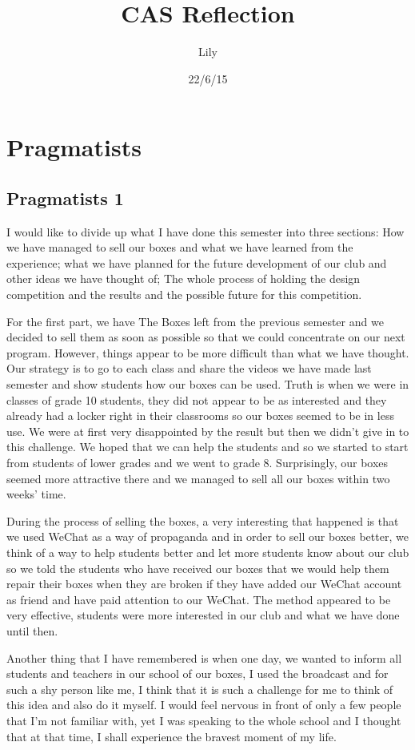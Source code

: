 \documentclass[11pt,a4paper,titlepage]{article}
\author{Lily}
\date{22/6/15}
\title{CAS Reflection}
\begin{document}
\maketitle

\tableofcontents
\clearpage

\section{Pragmatists}
\subsection{Pragmatists 1}
I would like to divide up what I have done this semester into three sections: How we have managed to sell our boxes and what we have learned from the experience; what we have planned for the future development of our club and other ideas we have thought of; The whole process of holding the design competition and the results and the possible future for this competition.

For the first part, we have The Boxes left from the previous semester and we decided to sell them as soon as possible so that we could concentrate on our next program. However, things appear to be more difficult than what we have thought. Our strategy is to go to each class and share the videos we have made last semester and show students how our boxes can be used. Truth is when we were in classes of grade 10 students, they did not appear to be as interested and they already had a locker right in their classrooms so our boxes seemed to be in less use. We were at first very disappointed by the result but then we didn’t give in to this challenge. We hoped that we can help the students and so we started to start from students of lower grades and we went to grade 8. Surprisingly, our boxes seemed more attractive there and we managed to sell all our boxes within two weeks’ time.

During the process of selling the boxes, a very interesting that happened is that we used WeChat as a way of propaganda and in order to sell our boxes better, we think of a way to help students better and let more students know about our club so we told the students who have received our boxes that we would help them repair their boxes when they are broken if they have added our WeChat account as friend and have paid attention to our WeChat. The method appeared to be very effective, students were more interested in our club and what we have done until then.

Another thing that I have remembered is when one day, we wanted to inform all students and teachers in our school of our boxes, I used the broadcast and for such a shy person like me, I think that it is such a challenge for me to think of this idea and also do it myself. I would feel nervous in front of only a few people that I’m not familiar with, yet I was speaking to the whole school and I thought that at that time, I shall experience the bravest moment of my life.
\end{document}
